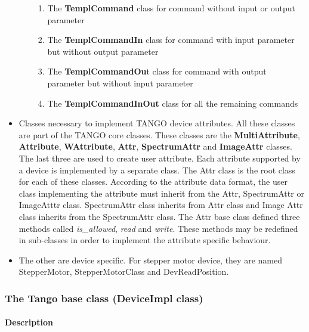 \begin{itemize}
\begin{enumerate}
\begin{enumerate}
\item The \textbf{TemplCommand} class for command without
input or output parameter
\item The \textbf{TemplCommandIn} class for command
with input parameter but without output parameter
\item The \textbf{TemplCommandOu}t class for command
with output parameter but without input parameter
\item The \textbf{TemplCommandInOut} class for
all the remaining commands
\end{enumerate}
\end{enumerate}
\item Classes necessary to implement TANGO device attributes.
All these classes are part of the TANGO core classes. These classes
are the \textbf{MultiAttribute}, \textbf{Attribute},
\textbf{WAttribute}, \textbf{Attr},
\textbf{SpectrumAttr} and \textbf{ImageAttr}
classes. The last three are used to create user attribute. Each attribute
supported by a device is implemented by a separate class. The Attr
class is the root class for each of these classes. According to the
attribute data format, the user class implementing the attribute must
inherit from the Attr, SpectrumAttr or ImageAtttr class. SpectrumAttr
class inherits from Attr class and Image Attr class inherits from
the SpectrumAttr class. The Attr base class defined three methods
called \emph{is\_allowed}, \emph{read}
and \emph{write}. These methods may be redefined in
sub-classes in order to implement the attribute specific behaviour.
\item The other are device specific. For stepper motor device, they are
named StepperMotor, StepperMotorClass and DevReadPosition.
\end{itemize}

\subsubsection{The Tango base class (DeviceImpl class)}


\paragraph{Description}

